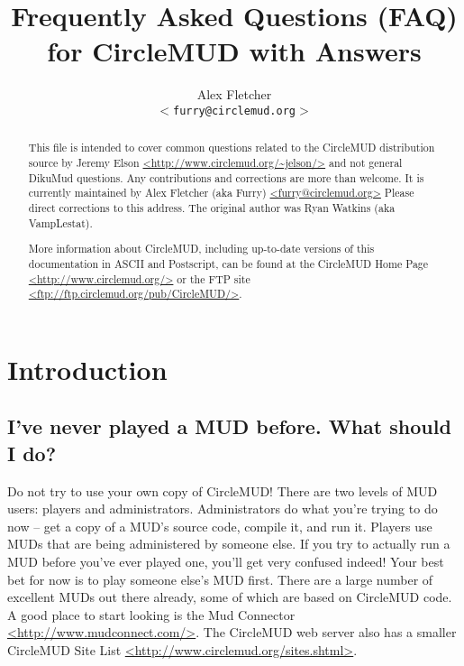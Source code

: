 \documentclass[11pt]{article}
\title{Frequently Asked Questions (FAQ) for CircleMUD with Answers}
\author{Alex Fletcher\\
\texttt{$<$furry@circlemud.org$>$}}
\begin{document}
\maketitle

\begin{abstract}
This file is intended to cover common questions related to the CircleMUD distribution source by
Jeremy Elson \url{<http://www.circlemud.org/~jelson/>} and not general DikuMud questions.  Any contributions and corrections are more than welcome.  It is currently maintained by Alex Fletcher (aka Furry) \url{<furry@circlemud.org>} Please direct corrections to this address.  The original author was Ryan Watkins (aka VampLestat).\par
More information about CircleMUD, including up-to-date versions of this documentation in ASCII and Postscript, can be found at the CircleMUD Home Page \url{<http://www.circlemud.org/>} or the FTP site \url{<ftp://ftp.circlemud.org/pub/CircleMUD/>}.
\end{abstract}

\tableofcontents

\section{Introduction}
\subsection{I've never played a MUD before.  What should I do?}
Do not try to use your own copy of CircleMUD! There are two levels of MUD users: players and administrators.  Administrators do what you're trying to do now -- get a copy of a MUD's source code, compile it, and run it. Players use MUDs that are being administered by someone else.  If you try to actually run a MUD before you've ever played one, you'll get very confused indeed! Your best bet for now is to play someone else's MUD first.  There are a large number of excellent MUDs out there already, some of which are based on CircleMUD code.  A good place to start looking is the Mud Connector \url{<http://www.mudconnect.com/>}. The CircleMUD web server also has a smaller CircleMUD Site List \url{<http://www.circlemud.org/sites.shtml>}.
\end{document}
